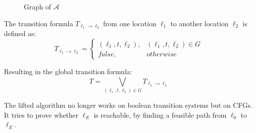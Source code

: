 \documentclass[11pt, a4paper, BCOR=10mm, ngerman, oneside]{scrbook}
\begin{document}
\begin{figure}[H]
\centering
{}
  \caption{Graph of $\mathcal{A}$}
 \end{figure}
 \label{ex1} 

The transition formula $T_{\ell_1 \rightarrow \ell_2}$ from one location $\ell_1$ to another location $\ell_2$ is defined as:
\begin{equation*}
T_{\ell_1 \rightarrow \ell_2} = \begin{cases} (\ell_1, t, \ell_2), & (\ell_1, t, \ell_2) \in G \\
                     false, & otherwise
       \end{cases}
\end{equation*}

Resulting in the global transition formula: \\
$$ T = \bigvee_{(\ell_1, t, \ell_2) \in G} T_{\ell_1 \rightarrow \ell_2}$$

The lifted algorithm no longer works on boolean transition systems but on CFGs. It tries to prove whether $\ell_E$ is reachable, by finding a feasible path from $\ell_0$ to $\ell_E$.
\end{document}
